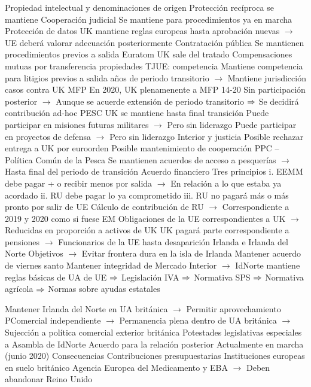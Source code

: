 \documentclass{nuevotema}
\begin{document}
\begin{esquemal}
				\4 Propiedad intelectual y denominaciones de origen
				\4[] Protección recíproca se mantiene
				\4 Cooperación judicial
				\4[] Se mantiene para procedimientos ya en marcha
				\4 Protección de datos
				\4[] UK mantiene reglas europeas hasta aprobación nuevas
				\4[] $\to$ UE deberá valorar adecuación posteriormente
				\4 Contratación pública
				\4[] Se mantienen procedimientos previos a salida
				\4 Euratom
				\4[] UK sale del tratado
				\4[] Compensaciones mutuas por transferencia propiedades
				\4 TJUE: competencia
				\4[] Mantiene competencia para litigios previos a salida
				 años de periodo transitorio
				\4[] $\to$ Mantiene jurisdicción casos contra UK
				\4 MFP
				\4[] En 2020, UK plenamenente a MFP 14-20
				\4[] Sin participación posterior
				\4[] $\to$ Aunque se acuerde extensión de periodo transitorio
				\4[] $\Rightarrow$ Se decidirá contribución ad-hoc
				\4 PESC
				\4[] UK se mantiene hasta final transición
				\4[] Puede participar en misiones futuras militares
				\4[] $\to$ Pero sin liderazgo
				\4[] Puede participar en proyectos de defensa
				\4[] $\to$ Pero sin liderazgo
				\4 Interior y justicia
				\4[] Posible rechazar entrega a UK por euroorden
				\4[] Posible mantenimiento de cooperación
				\4 PPC -- Política Común de la Pesca
				\4[] Se mantienen acuerdos de acceso a pesquerías
				\4[] $\to$ Hasta final del periodo de transición
				\4 Acuerdo financiero
				\4[] Tres principios
				\4[] i. EEMM debe pagar + o recibir menos por salida
				\4[] $\to$ En relación a lo que estaba ya acordado
				\4[] ii. RU debe pagar lo ya comprometido
				\4[] iii. RU no pagará más o más pronto por salir de UE
				\4[] Cálculo de contribución de RU
				\4[] $\to$ Correspondiente a 2019 y 2020 como si fuese EM
				\4[] Obligaciones de la UE correspondientes a UK
				\4[] $\to$ Reducidas en proporción a activos de UK
				\4[] UK pagará parte correspondiente a pensiones
				\4[] $\to$ Funcionarios de la UE hasta desaparición
				\4 Irlanda e Irlanda del Norte
				\4[] Objetivos
				\4[] $\to$ Evitar frontera dura en la isla de Irlanda
				\4[] Mantener acuerdo de viernes santo
				\4[] Mantener integridad de Mercado Interior
				\4[] $\to$ IdNorte mantiene reglas básicas de UA de UE
				\4[] $\Rightarrow$ Legislación IVA
				\4[] $\Rightarrow$ Normativa SPS
				\4[] $\Rightarrow$ Normativa agrícola
				\4[] $\Rightarrow$ Normas sobre ayudas estatales

				\4[] Mantener Irlanda del Norte en UA británica
				\4[] $\to$ Permitir aprovechamiento PComercial independiente
				\4[] $\to$ Permanencia plena dentro de UA británica
				\4[] $\to$ Sujección a política comercial exterior británica
				\4[] Potestades legislativas especiales a Asambla de IdNorte
			\3 Acuerdo para la relación posterior
				\4 Actualmente en marcha (junio 2020)
			\3 Consecuencias
				\4 Contribuciones presupuestarias
				\4 Instituciones europeas en suelo británico
				\4[] Agencia Europea del Medicamento y EBA
				\4[] $\to$ Deben abandonar Reino Unido
					

\end{esquemal}
\end{document}
